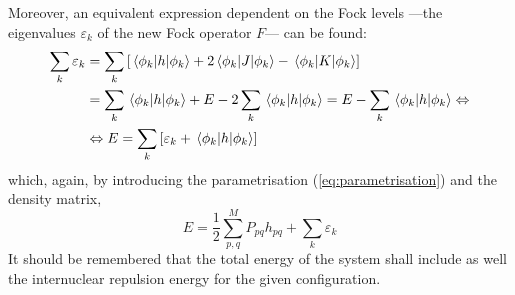 Moreover, an equivalent expression dependent on the Fock levels ---the eigenvalues $\varepsilon_k$ of the new Fock operator $F$--- can be found:
\begin{align}
    \sum_k \varepsilon_k &= \sum_k\left[\mel{\phi_k}{h}{\phi_k}+2\mel{\phi_k}{J}{\phi_k}-\mel{\phi_k}{K}{\phi_k}\right]\nonumber\\
    &=\sum_k\mel{\phi_k}{h}{\phi_k} + E - 2\sum_k\mel{\phi_k}{h}{\phi_k} = E - \sum_k\mel{\phi_k}{h}{\phi_k}\Leftrightarrow\nonumber\\
    &\Leftrightarrow E = \sum_k \left[\varepsilon_k + \mel{\phi_k}{h}{\phi_k}\right]
\end{align}
which, again, by introducing the parametrisation (\ref{eq:parametrisation}) and the density matrix,
\begin{equation}
    E = \frac{1}{2}\sum_{p,q}^MP_{pq} h_{pq}+\sum_k \varepsilon_k
\end{equation}
It should be remembered that the total energy of the system shall include as well the internuclear repulsion energy for the given configuration.